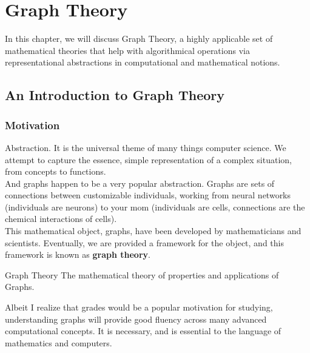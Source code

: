 \chapter{Graph Theory}
In this chapter, we will discuss Graph Theory, a highly applicable set of mathematical theories that help with algorithmical operations via representational abstractions in computational and mathematical notions.

\section{An Introduction to Graph Theory}

\subsection{Motivation}
Abstraction. It is the universal theme of many things computer science. We attempt to capture the essence, simple representation of a complex situation, from concepts to functions. \\
And graphs happen to be a very popular abstraction. Graphs are sets of connections between customizable individuals, working from neural networks (individuals are neurons) to your mom (individuals are cells, connections are the chemical interactions of cells). \\
This mathematical object, graphs, have been developed by mathematicians and scientists. Eventually, we are provided a framework for the object, and this framework is known as \textbf{graph theory}.
\begin{ln-define}{Graph Theory}{}
    The mathematical theory of properties and applications of Graphs.
\end{ln-define}
Albeit I realize that grades would be a popular motivation for studying, understanding graphs will provide good fluency across many advanced computational concepts. It is necessary, and is essential to the language of mathematics and computers.

